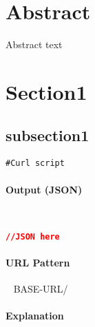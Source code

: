 \documentclass[
10pt, %
letterpaper, %
oneside, %
headinclude,footinclude, %
BCOR5mm, %
]{scrartcl}
\title{\normalfont\spacedallcaps{Documentation Template}} %
\author{\spacedlowsmallcaps{Michael Meding* , mmeding@outsmartinc.com}} %
\date{} %
\begin{document}
\maketitle %

\setcounter{tocdepth}{2} %

\tableofcontents %

\thispagestyle{empty} %

 
\section*{Abstract}
Abstract text
 


\section{Section1}


\subsection{subsection1}
\begin{lstlisting}
#Curl script
\end{lstlisting}

\paragraph{Output (JSON)}~
\begin{lstlisting}[language=json]
//JSON here
\end{lstlisting}


\paragraph{URL Pattern} 
~\newline
BASE-URL/

\paragraph{Explanation}
\end{document}
